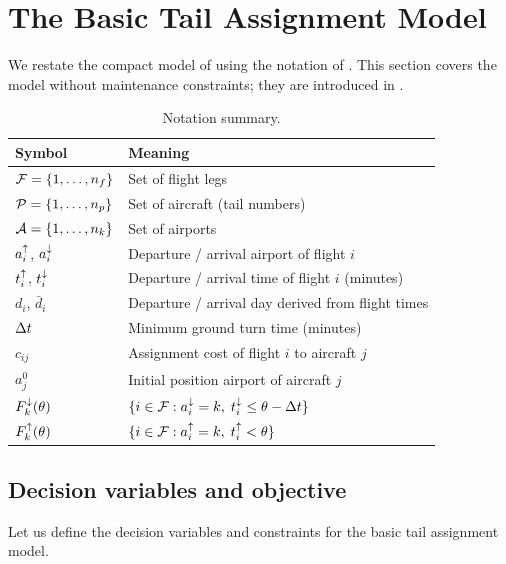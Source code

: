 \section{The Basic Tail Assignment Model}
\label{sec:basic}

We restate the compact model of \citet{khaled2018compact} using the notation
of .  This section covers the model without maintenance
constraints; they are introduced in .

\begin{table}[t]
\centering\small
\caption{Notation summary.}
\label{tab:notation}
\begin{tabular}{ll}
\toprule
Symbol & Meaning \\
\midrule
$\mathcal{F} = \{1,\ldots,n_f\}$     & Set of flight legs \\
$\mathcal{P} = \{1,\ldots,n_p\}$    & Set of aircraft (tail numbers) \\
$\mathcal{A} = \{1,\ldots,n_k\}$     & Set of airports \\
$a^{\uparrow}_{i}$, $a^{\downarrow}_{i}$          & Departure / arrival airport of flight $i$ \\
$t^{\uparrow}_{i}$, $t^{\downarrow}_{i}$          & Departure / arrival time of flight $i$ (minutes) \\
$d_i$, $\bar d_i$           & Departure / arrival day derived from flight times \\
$\Delta t$                        & Minimum ground turn time (minutes) \\
$c_{ij}$                     & Assignment cost of flight $i$ to aircraft $j$ \\
$a^0_j$                      & Initial position airport of aircraft $j$ \\
$F^{\downarrow}_{k}(\theta)$             & $\{i \in \mathcal{F} : a^{\downarrow}_{i} = k,\; t^{\downarrow}_{i} \le \theta - \Delta t\}$ \\
$F^{\uparrow}_{k}(\theta)$             & $\{i \in \mathcal{F} : a^{\uparrow}_{i} = k,\; t^{\uparrow}_{i} < \theta\}$ \\
\bottomrule
\end{tabular}
\end{table}

\subsection{Decision variables and objective}

Let us define the decision variables and constraints for the basic tail assignment model.
